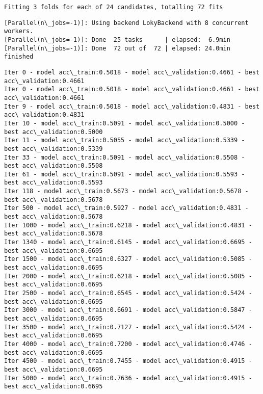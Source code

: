 \documentclass[a4paper,12pt]{article}
\begin{document}
\begin{Verbatim}[commandchars=\\\{\},fontsize=\small]
Fitting 3 folds for each of 24 candidates, totalling 72 fits
    \end{Verbatim}
    \begin{Verbatim}[commandchars=\\\{\},fontsize=\small]
[Parallel(n\_jobs=-1)]: Using backend LokyBackend with 8 concurrent workers.
[Parallel(n\_jobs=-1)]: Done  25 tasks      | elapsed:  6.9min
[Parallel(n\_jobs=-1)]: Done  72 out of  72 | elapsed: 24.0min finished
    \end{Verbatim}
    \begin{Verbatim}[commandchars=\\\{\},fontsize=\small]
Iter 0 - model acc\_train:0.5018 - model acc\_validation:0.4661 - best acc\_validation:0.4661
Iter 0 - model acc\_train:0.5018 - model acc\_validation:0.4661 - best acc\_validation:0.4661
Iter 9 - model acc\_train:0.5018 - model acc\_validation:0.4831 - best acc\_validation:0.4831
Iter 10 - model acc\_train:0.5091 - model acc\_validation:0.5000 - best acc\_validation:0.5000
Iter 11 - model acc\_train:0.5055 - model acc\_validation:0.5339 - best acc\_validation:0.5339
Iter 33 - model acc\_train:0.5091 - model acc\_validation:0.5508 - best acc\_validation:0.5508
Iter 61 - model acc\_train:0.5091 - model acc\_validation:0.5593 - best acc\_validation:0.5593
Iter 118 - model acc\_train:0.5673 - model acc\_validation:0.5678 - best acc\_validation:0.5678
Iter 500 - model acc\_train:0.5927 - model acc\_validation:0.4831 - best acc\_validation:0.5678
Iter 1000 - model acc\_train:0.6218 - model acc\_validation:0.4831 - best acc\_validation:0.5678
Iter 1340 - model acc\_train:0.6145 - model acc\_validation:0.6695 - best acc\_validation:0.6695
Iter 1500 - model acc\_train:0.6327 - model acc\_validation:0.5085 - best acc\_validation:0.6695
Iter 2000 - model acc\_train:0.6218 - model acc\_validation:0.5085 - best acc\_validation:0.6695
Iter 2500 - model acc\_train:0.6545 - model acc\_validation:0.5424 - best acc\_validation:0.6695
Iter 3000 - model acc\_train:0.6691 - model acc\_validation:0.5847 - best acc\_validation:0.6695
Iter 3500 - model acc\_train:0.7127 - model acc\_validation:0.5424 - best acc\_validation:0.6695
Iter 4000 - model acc\_train:0.7200 - model acc\_validation:0.4746 - best acc\_validation:0.6695
Iter 4500 - model acc\_train:0.7455 - model acc\_validation:0.4915 - best acc\_validation:0.6695
Iter 5000 - model acc\_train:0.7636 - model acc\_validation:0.4915 - best acc\_validation:0.6695

\end{Verbatim}
\end{document}
